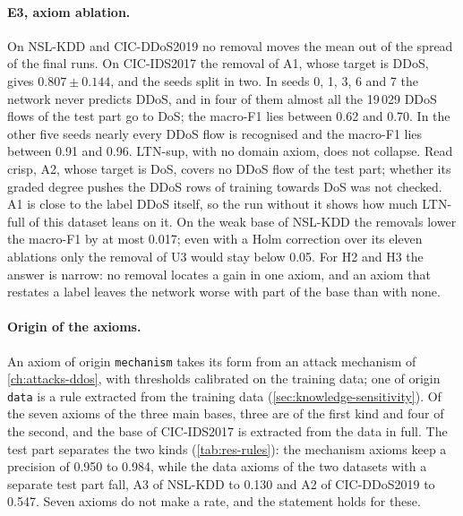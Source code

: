 \paragraph{E3, axiom ablation.}
On NSL-KDD and CIC-DDoS2019 no removal moves the mean out of the spread of the final runs. On CIC-IDS2017 the removal of
A1, whose target is DDoS, gives $0.807 \pm 0.144$, and the seeds split in two. In seeds 0, 1, 3, 6 and 7 the network never
predicts DDoS, and in four of them almost all the 19\,029 DDoS flows of the test part go to DoS; the macro-F1 lies
between 0.62 and 0.70. In the other five seeds nearly every DDoS flow is recognised and the macro-F1 lies between 0.91
and 0.96. LTN-sup, with no domain axiom, does not collapse. Read crisp, A2, whose target is
DoS, covers no DDoS flow of the test part; whether its graded degree pushes the DDoS rows of training towards DoS was not
checked. A1 is close to the label DDoS itself, so the run without it shows how much LTN-full of this dataset leans on it.
On the weak base of NSL-KDD the removals lower the macro-F1 by at most 0.017; even with a Holm correction over its
eleven ablations only the removal of U3 would stay below 0.05. For H2 and H3 the answer is narrow: no removal locates a gain in one axiom,
and an axiom that restates a label leaves the network worse with part of the base than with none.

\paragraph{Origin of the axioms.}
An axiom of origin \texttt{mechanism} takes its form from an attack mechanism of \cref{ch:attacks-ddos}, with
thresholds calibrated on the training data; one of origin \texttt{data} is a rule extracted from the training data
(\cref{sec:knowledge-sensitivity}). Of the seven axioms of the three main
bases, three are of the first kind and four of the second, and the base of CIC-IDS2017 is extracted from the data
in full. The test part separates the two kinds (\cref{tab:res-rules}): the mechanism axioms keep a precision of 0.950 to
0.984, while the data axioms of the two datasets with a separate test part fall, A3 of NSL-KDD to 0.130 and A2 of
CIC-DDoS2019 to 0.547. Seven axioms do not make a rate, and the statement holds for these.

